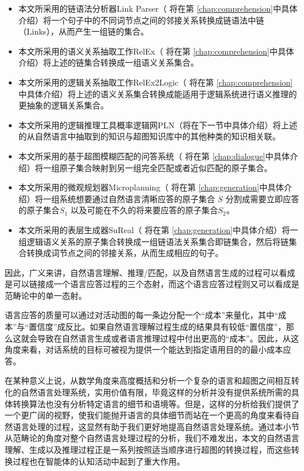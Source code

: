 \begin{itemize}
\item 本文所采用的链语法分析器Link Parser（ 将在第 \ref{chap:comprehension}中具体介绍）将一个句子中的不同词节点之间的邻接关系转换成链语法中链（Links），从而产生一组链的集合。
\item 本文所采用的语义关系抽取工作RelEx（ 将在第 \ref{chap:comprehension}中具体介绍）将上述的链集合转换成一组语义关系集合。
\item 本文所采用的逻辑关系抽取工作RelEx2Logic（ 将在第 \ref{chap:comprehension}中具体介绍）将上述的语义关系集合转换成能适用于逻辑系统进行语义推理的更抽象的逻辑关系集合。
\item 本文所采用的逻辑推理工具概率逻辑网PLN（将在下一节中具体介绍）将上述的从自然语言中抽取到的知识与超图知识库中的其他种类的知识相关联。
\item 本文所采用的基于超图模糊匹配的问答系统（ 将在第 \ref{chap:dialogue}中具体介绍）将一组原子集合映射到另一组完全匹配或者近似匹配的原子集合。
\item 本文所采用的微观规划器Microplanning（ 将在第 \ref{chap:generation}中具体介绍）将一组系统想要通过自然语言清晰应答的原子集合 $S$ 分割成需要立即应答的原子集合$S_1$ 以及可能在不久的将来要应答的原子集合$S_2$。
\item 本文所采用的表层生成器SuReal（ 将在第 \ref{chap:generation}中具体介绍）将一组逻辑语义关系的原子集合转换成一组链语法关系集合即链集合，然后将链集合转换成词节点之间的邻接关系，从而生成相应的句子。
\end{itemize}

因此，广义来讲，自然语言理解、推理/匹配，以及自然语言生成的过程可以看成是可以链接成一个语言应答过程的三个态射，而这个语言应答过程则又可以看成是范畴论中的单一态射。

语言应答的质量可以通过对活动图的每一条边分配一个“成本”来量化，其中“成本”与“置信度”成反比。如果自然语言理解过程生成的结果具有较低“置信度”，那么这就会导致在自然语言生成或者语言推理过程中付出更高的“成本”。因此，从这角度来看，对话系统的目标可被视为提供一个能达到指定语用目的的最小成本应答。

在某种意义上说，从数学角度来高度概括和分析一个复杂的语言和超图之间相互转化的自然语言处理系统，实用价值有限，毕竟这样的分析并没有提供系统所需的具体转换算法也没有分析特定语言的细节和语境等。但是，这样的分析给我们提供了一个更广阔的视野，使我们能抛开语言的具体细节而站在一个更高的角度来看待自然语言处理的过程，这显然有助于我们更好地提高自然语言处理系统。通过本小节从范畴论的角度对整个自然语言处理过程的分析，我们不难发出，本文的自然语言理解、生成以及推理过程正是一系列按照适当顺序进行超图的转换过程，而这些转换过程也在智能体的认知活动中起到了重大作用。

